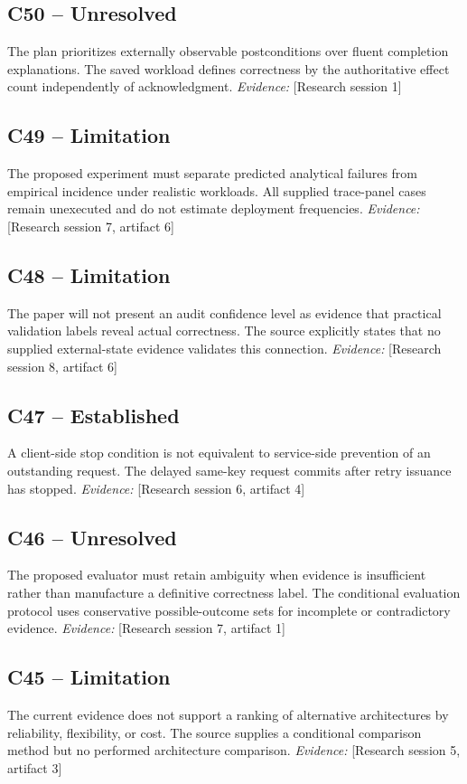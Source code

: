\documentclass[11pt]{article}
\begin{document}
\begin{sloppypar}
\subsection{C50 -- Unresolved}
The plan prioritizes externally observable postconditions over fluent completion explanations.
The saved workload defines correctness by the authoritative effect count independently of acknowledgment.
\textit{Evidence: }[Research session 1]
\subsection{C49 -- Limitation}
The proposed experiment must separate predicted analytical failures from empirical incidence under realistic workloads.
All supplied trace-panel cases remain unexecuted and do not estimate deployment frequencies.
\textit{Evidence: }[Research session 7, artifact 6]
\subsection{C48 -- Limitation}
The paper will not present an audit confidence level as evidence that practical validation labels reveal actual correctness.
The source explicitly states that no supplied external-state evidence validates this connection.
\textit{Evidence: }[Research session 8, artifact 6]
\subsection{C47 -- Established}
A client-side stop condition is not equivalent to service-side prevention of an outstanding request.
The delayed same-key request commits after retry issuance has stopped.
\textit{Evidence: }[Research session 6, artifact 4]
\subsection{C46 -- Unresolved}
The proposed evaluator must retain ambiguity when evidence is insufficient rather than manufacture a definitive correctness label.
The conditional evaluation protocol uses conservative possible-outcome sets for incomplete or contradictory evidence.
\textit{Evidence: }[Research session 7, artifact 1]
\subsection{C45 -- Limitation}
The current evidence does not support a ranking of alternative architectures by reliability, flexibility, or cost.
The source supplies a conditional comparison method but no performed architecture comparison.
\textit{Evidence: }[Research session 5, artifact 3]

\end{sloppypar}
\end{document}
